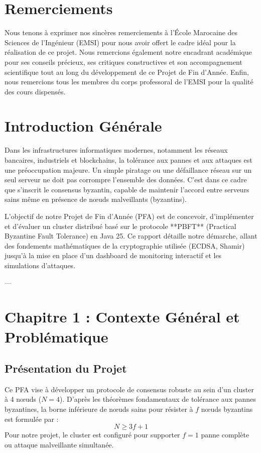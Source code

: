 \documentclass[11pt,a4paper]{article}
\begin{document}
\newpage
\tableofcontents
\newpage

\section*{Remerciements}
Nous tenons à exprimer nos sincères remerciements à l'École Marocaine des Sciences de l'Ingénieur (EMSI) pour nous avoir offert le cadre idéal pour la réalisation de ce projet. Nous remercions également notre encadrant académique pour ses conseils précieux, ses critiques constructives et son accompagnement scientifique tout au long du développement de ce Projet de Fin d'Année. Enfin, nous remercions tous les membres du corps professoral de l'EMSI pour la qualité des cours dispensés.

\newpage

\section*{Introduction Générale}
Dans les infrastructures informatiques modernes, notamment les réseaux bancaires, industriels et blockchains, la tolérance aux pannes et aux attaques est une préoccupation majeure. Un simple piratage ou une défaillance réseau sur un seul serveur ne doit pas corrompre l'ensemble des données. C'est dans ce cadre que s'inscrit le consensus byzantin, capable de maintenir l'accord entre serveurs sains même en présence de nœuds malveillants (byzantins).

L'objectif de notre Projet de Fin d'Année (PFA) est de concevoir, d'implémenter et d'évaluer un cluster distribué basé sur le protocole **PBFT** (Practical Byzantine Fault Tolerance) en Java 25. Ce rapport détaille notre démarche, allant des fondements mathématiques de la cryptographie utilisée (ECDSA, Shamir) jusqu'à la mise en place d'un dashboard de monitoring interactif et les simulations d'attaques.

---

\section{Chapitre 1 : Contexte Général et Problématique}

\subsection{Présentation du Projet}
Ce PFA vise à développer un protocole de consensus robuste au sein d'un cluster à 4 nœuds ($N=4$). D'après les théorèmes fondamentaux de tolérance aux pannes byzantines, la borne inférieure de nœuds sains pour résister à $f$ nœuds byzantins est formulée par :
\begin{equation}
N \ge 3f + 1
\end{equation}
Pour notre projet, le cluster est configuré pour supporter $f=1$ panne complète ou attaque malveillante simultanée.
\end{document}
